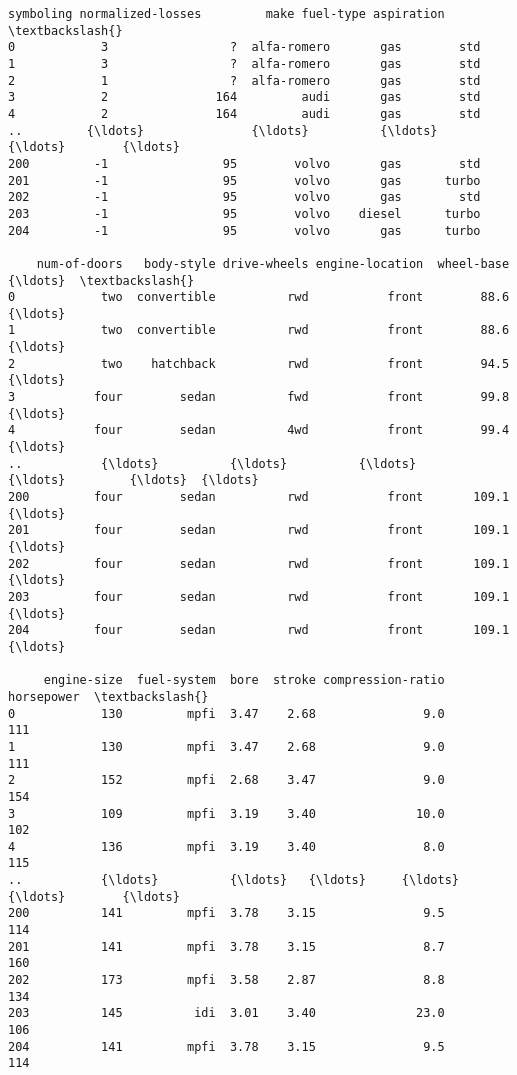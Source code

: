 \documentclass[11pt]{article}
\makeatletter
\newcommand{\boxspacing}{\kern\kvtcb@left@rule\kern\kvtcb@boxsep}
\newcommand{\prompt}[4]{
        \ttfamily\llap{{\color{#2}[#3]:\hspace{3pt}#4}}\vspace{-\baselineskip}
    }
\makeatother
\begin{document}
            \begin{tcolorbox}[breakable, size=fbox, boxrule=.5pt, pad at break*=1mm, opacityfill=0]
\prompt{Out}{outcolor}{7}{\boxspacing}
\begin{Verbatim}[commandchars=\\\{\}]
     symboling normalized-losses         make fuel-type aspiration  \textbackslash{}
0            3                 ?  alfa-romero       gas        std
1            3                 ?  alfa-romero       gas        std
2            1                 ?  alfa-romero       gas        std
3            2               164         audi       gas        std
4            2               164         audi       gas        std
..         {\ldots}               {\ldots}          {\ldots}       {\ldots}        {\ldots}
200         -1                95        volvo       gas        std
201         -1                95        volvo       gas      turbo
202         -1                95        volvo       gas        std
203         -1                95        volvo    diesel      turbo
204         -1                95        volvo       gas      turbo

    num-of-doors   body-style drive-wheels engine-location  wheel-base  {\ldots}  \textbackslash{}
0            two  convertible          rwd           front        88.6  {\ldots}
1            two  convertible          rwd           front        88.6  {\ldots}
2            two    hatchback          rwd           front        94.5  {\ldots}
3           four        sedan          fwd           front        99.8  {\ldots}
4           four        sedan          4wd           front        99.4  {\ldots}
..           {\ldots}          {\ldots}          {\ldots}             {\ldots}         {\ldots}  {\ldots}
200         four        sedan          rwd           front       109.1  {\ldots}
201         four        sedan          rwd           front       109.1  {\ldots}
202         four        sedan          rwd           front       109.1  {\ldots}
203         four        sedan          rwd           front       109.1  {\ldots}
204         four        sedan          rwd           front       109.1  {\ldots}

     engine-size  fuel-system  bore  stroke compression-ratio horsepower  \textbackslash{}
0            130         mpfi  3.47    2.68               9.0        111
1            130         mpfi  3.47    2.68               9.0        111
2            152         mpfi  2.68    3.47               9.0        154
3            109         mpfi  3.19    3.40              10.0        102
4            136         mpfi  3.19    3.40               8.0        115
..           {\ldots}          {\ldots}   {\ldots}     {\ldots}               {\ldots}        {\ldots}
200          141         mpfi  3.78    3.15               9.5        114
201          141         mpfi  3.78    3.15               8.7        160
202          173         mpfi  3.58    2.87               8.8        134
203          145          idi  3.01    3.40              23.0        106
204          141         mpfi  3.78    3.15               9.5        114


\end{Verbatim}
\end{tcolorbox}
\end{document}
